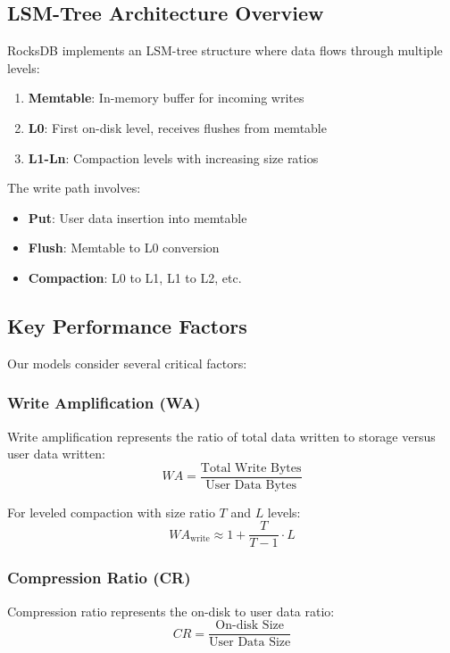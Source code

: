 \documentclass[11pt,twocolumn]{article}
\begin{document}
\subsection{LSM-Tree Architecture Overview}

RocksDB implements an LSM-tree structure where data flows through multiple levels:
\begin{enumerate}
    \item \textbf{Memtable}: In-memory buffer for incoming writes
    \item \textbf{L0}: First on-disk level, receives flushes from memtable
    \item \textbf{L1-Ln}: Compaction levels with increasing size ratios
\end{enumerate}

The write path involves:
\begin{itemize}
    \item \textbf{Put}: User data insertion into memtable
    \item \textbf{Flush}: Memtable to L0 conversion
    \item \textbf{Compaction}: L0 to L1, L1 to L2, etc.
\end{itemize}

\subsection{Key Performance Factors}

Our models consider several critical factors:

\subsubsection{Write Amplification (WA)}
Write amplification represents the ratio of total data written to storage versus user data written:
\begin{equation}
WA = \frac{\text{Total Write Bytes}}{\text{User Data Bytes}}
\end{equation}

For leveled compaction with size ratio $T$ and $L$ levels:
\begin{equation}
WA_{\text{write}} \approx 1 + \frac{T}{T-1} \cdot L
\end{equation}

\subsubsection{Compression Ratio (CR)}
Compression ratio represents the on-disk to user data ratio:
\begin{equation}
CR = \frac{\text{On-disk Size}}{\text{User Data Size}}
\end{equation}
\end{document}
